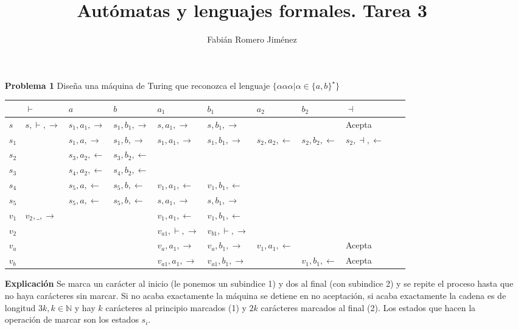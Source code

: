 \documentclass{article}
\title{Autómatas y lenguajes formales. Tarea 3}
\author{Fabián Romero Jiménez}
\begin{document}
\maketitle
\begin{enumerate}
\item[\bf{Problema 1}] Diseña una máquina de Turing que reconozca el lenguaje $\{\alpha\alpha\alpha | \alpha \in \{a, b\}^\star \}$

\begin{tabular}{|l||l|l|l|l|l|l|l|l|l|l|}
  \hline
   & $\vdash$ &$a$& $b$&$a_1$ & $b_1$ & $a_2$ & $b_2$  & $\dashv$ \\
  \hline  
  \hline  
  $s$      & $s,\vdash,\rightarrow$ &  $s_1,a_1,\rightarrow$ &  $s_1,b_1,\rightarrow$ &$s,a_1,\rightarrow$ &$s,b_1,\rightarrow$ &  &  & Acepta \\  
  \hline  
  $s_1$   &  &  $s_1,a,\rightarrow$ &  $s_1,b,\rightarrow$ & $s_1,a_1,\rightarrow$ &$s_1,b_1,\rightarrow$ &  $s_2,a_2,\leftarrow$ &  $s_2,b_2,\leftarrow$  & $s_2,\dashv,\leftarrow$  \\
  \hline  
  $s_2$    &  &  $s_3,a_2,\leftarrow$ &  $s_3,b_2,\leftarrow$ &  &  & & &\\  
  \hline  
  $s_3$    &  &  $s_4,a_2,\leftarrow$ &  $s_4,b_2,\leftarrow$ &  &  & & &\\  
  \hline  
  $s_4$    &  &  $s_5,a,\leftarrow$ &  $s_5,b,\leftarrow$ & $v_1,a_1,\leftarrow$  & $v_1,b_1,\leftarrow$  & & &\\  
  \hline  
  $s_5$    &  &  $s_5,a,\leftarrow$ &  $s_5,b,\leftarrow$ & $s,a_1,\rightarrow$  & $s,b_1,\rightarrow$  & & &\\
  \hline
  $v_1$    & $v_2,\_,\rightarrow$ & & & $v_1,a_1,\leftarrow$  & $v_1,b_1,\leftarrow$  & & &\\  
  \hline
  $v_2$    & &   &   & $v_{a1},\vdash,\rightarrow$ &  $v_{b1},\vdash,\rightarrow$ & & &  \\  
  \hline  
  $v_{a}$      &  &  & & $v_{a},a_1,\rightarrow$ &  $v_{a},b_1,\rightarrow$ & $v_1,a_1,\leftarrow$ &  & Acepta \\  
  \hline  
  $v_{b}$      &  &  & & $v_{a1},a_1,\rightarrow$ &  $v_{a1},b_1,\rightarrow$ & &$v_1,b_1,\leftarrow$  & Acepta \\  
  \hline  
\end{tabular}

\item[\bf{Explicación}]
Se marca un carácter al inicio (le ponemos un subindice 1) y dos al final (con subindice 2) y se repite el proceso hasta que no haya carácteres sin marcar.
Si no acaba exactamente la máquina se detiene en no aceptación, si acaba exactamente la cadena es de longitud $3k, k \in \mathbb{N}$ y hay $k$ carácteres al principio marcados (1) y $2k$ carácteres marcados al final (2). Los estados que hacen la operación de marcar son los estados $s_i$.


\end{enumerate}
\end{document}
